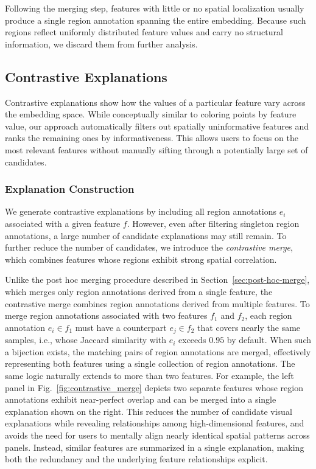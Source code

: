 \documentclass[lettersize,journal]{IEEEtran}
\begin{document}
Following the merging step, features with little or no spatial localization usually produce a single region annotation spanning the entire embedding.
Because such regions reflect uniformly distributed feature values and carry no structural information, we discard them from further analysis.

\subsection{Contrastive Explanations}
\label{sec:contrastive}

Contrastive explanations show how the values of a particular feature vary across the embedding space. While conceptually similar to coloring points by feature value, our approach automatically filters out spatially uninformative features and ranks the remaining ones by informativeness. This allows users to focus on the most relevant features without manually sifting through a potentially large set of candidates.

\subsubsection{Explanation Construction}
\label{sec:contrastive:explanation-construction}

We generate contrastive explanations by including all region annotations $e_i$ associated with a given feature $f$.
However, even after filtering singleton region annotations, a large number of candidate explanations may still remain.
To further reduce the number of candidates, we introduce the \textit{contrastive merge}, which combines features whose regions exhibit strong spatial correlation.

Unlike the post hoc merging procedure described in Section~\ref{sec:post-hoc-merge}, which merges only region annotations derived from a single feature, the contrastive merge combines region annotations derived from multiple features. To merge region annotations associated with two features $f_1$ and $f_2$, each region annotation $e_i \in f_1$ must have a counterpart $e_j \in f_2$ that covers nearly the same samples, i.e., whose Jaccard similarity with $e_i$ exceeds $0.95$ by default. When such a bijection exists, the matching pairs of region annotations are merged, effectively representing both features using a single collection of region annotations.
The same logic naturally extends to more than two features.
For example, the left panel in Fig.~\ref{fig:contrastive_merge} depicts two separate features whose region annotations exhibit near-perfect overlap and can be merged into a single explanation shown on the right.
This reduces the number of candidate visual explanations while revealing relationships among high-dimensional features, and avoids the need for users to mentally align nearly identical spatial patterns across panels. Instead, similar features are summarized in a single explanation, making both the redundancy and the underlying feature relationships explicit.
\end{document}
